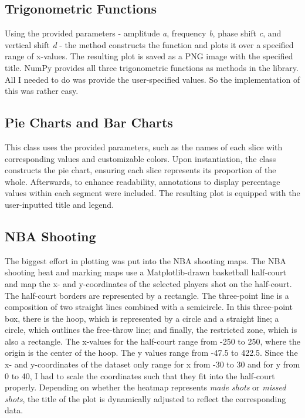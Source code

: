 \documentclass[sn-mathphys-num]{sn-jnl}%
\theoremstyle{thmstyleone}%
\theoremstyle{thmstyletwo}%
\theoremstyle{thmstylethree}%
\begin{document}
\subsection{Trigonometric Functions}\label{subsec2}
Using the provided parameters - amplitude \textit{a}, frequency \textit{b}, phase shift \textit{c}, and vertical shift \textit{d} - the method constructs the function and plots it over a specified range of x-values. The resulting plot is saved as a PNG image with the specified title. NumPy provides all three trigonometric functions as methods in the library. All I needed to do was provide the user-specified values. So the implementation of this was rather easy.

\subsection{Pie Charts and Bar Charts}\label{subsec3}

This class uses the provided parameters, such as the names of each slice with corresponding values and customizable colors. Upon instantiation, the class constructs the pie chart, ensuring each slice represents its proportion of the whole. Afterwards, to enhance readability, annotations to display percentage values within each segment were included. The resulting plot is equipped with the user-inputted title and legend.

\subsection{NBA Shooting}\label{subsec4}
The biggest effort in plotting was put into the NBA shooting maps. The NBA shooting heat and marking maps use a Matplotlib-drawn basketball half-court and map the x- and y-coordinates of the selected players shot on the half-court. The half-court borders are represented by a rectangle. The three-point line is a composition of two straight lines combined with a semicircle. In this three-point box, there is the hoop, which is represented by a circle and a straight line; a circle, which outlines the free-throw line; and finally, the restricted zone, which is also a rectangle. The x-values for the half-court range from -250 to 250, where the origin is the center of the hoop. The y values range from -47.5 to 422.5. Since the x- and y-coordinates of the dataset only range for x from -30 to 30 and for y from 0 to 40, I had to scale the coordinates such that they fit into the half-court properly. Depending on whether the heatmap represents \textit{made shots} or \textit{missed shots}, the title of the plot is dynamically adjusted to reflect the corresponding data.
\end{document}
